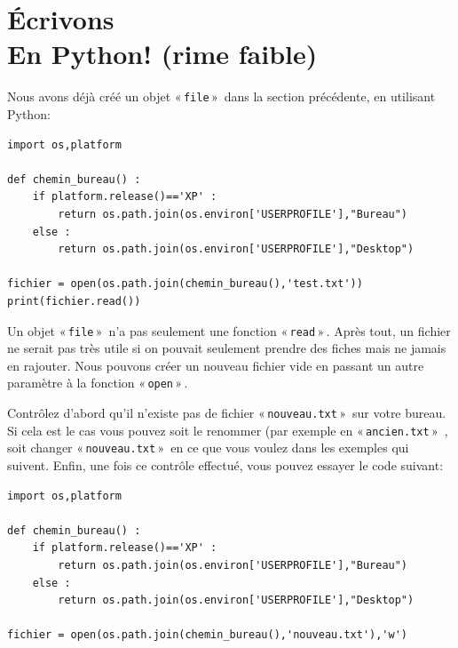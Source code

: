 \begin{center}
\end{center}

\section{Écrivons\\
En Python! (rime faible)}

Nous avons déjà créé un objet « \texttt{file} »  dans la section précédente, en utilisant Python:

\begin{Verbatim}[frame=single,rulecolor=\color{gray}, label=ne pas saisir]
import os,platform

def chemin_bureau() :
    if platform.release()=='XP' :
        return os.path.join(os.environ['USERPROFILE'],"Bureau")
    else :
        return os.path.join(os.environ['USERPROFILE'],"Desktop")
    
fichier = open(os.path.join(chemin_bureau(),'test.txt'))
print(fichier.read())
\end{Verbatim}

Un objet « \texttt{file} »  n'a pas seulement une fonction « \texttt{read} » . Après tout, un fichier ne serait pas très utile si on pouvait seulement prendre des fiches mais ne jamais en rajouter. Nous pouvons créer un nouveau fichier vide en passant un autre paramètre à la fonction « \texttt{open} » .

Contrôlez d'abord qu'il n'existe pas de fichier « \texttt{nouveau.txt} »  sur votre bureau. Si cela est le cas vous pouvez soit le renommer (par exemple en « \texttt{ancien.txt} »  , soit changer « \texttt{nouveau.txt} »  en ce que vous voulez dans les exemples qui suivent. Enfin, une fois ce contrôle effectué, vous pouvez essayer le code suivant:

\begin{Verbatim}[frame=single,rulecolor=\color{mbleu}, label=à taper par exemple en reprenant l'existant]
import os,platform

def chemin_bureau() :
    if platform.release()=='XP' :
        return os.path.join(os.environ['USERPROFILE'],"Bureau")
    else :
        return os.path.join(os.environ['USERPROFILE'],"Desktop")
    
fichier = open(os.path.join(chemin_bureau(),'nouveau.txt'),'w')
\end{Verbatim}

